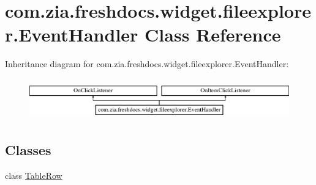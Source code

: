 \hypertarget{classcom_1_1zia_1_1freshdocs_1_1widget_1_1fileexplorer_1_1_event_handler}{\section{com.\-zia.\-freshdocs.\-widget.\-fileexplorer.\-Event\-Handler Class Reference}
\label{classcom_1_1zia_1_1freshdocs_1_1widget_1_1fileexplorer_1_1_event_handler}
}
Inheritance diagram for com.\-zia.\-freshdocs.\-widget.\-fileexplorer.\-Event\-Handler\-:\begin{figure}[H]
\begin{center}
\leavevmode
\includegraphics[height=1.794872cm]{classcom_1_1zia_1_1freshdocs_1_1widget_1_1fileexplorer_1_1_event_handler}
\end{center}
\end{figure}
\subsection*{Classes}
\begin{DoxyCompactItemize}
\item 
class \hyperlink{classcom_1_1zia_1_1freshdocs_1_1widget_1_1fileexplorer_1_1_event_handler_1_1_table_row}{Table\-Row}
\end{DoxyCompactItemize}
